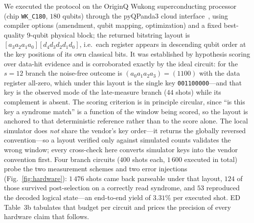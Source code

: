 \documentclass[aps,prxquantum,reprint,superscriptaddress]{revtex4-2}
\begin{document}
We executed the protocol on the OriginQ Wukong superconducting processor
(chip \texttt{WK\_C180}, $180$ qubits) through the pyQPanda3 cloud
interface~\cite{pyqpanda3,originq_cloud}, using compiler options
(amendment, qubit mapping, optimization) and a fixed best-quality $9$-qubit
physical block; the returned bitstring layout is
$[a_3a_2a_1a_0][d_4d_3d_2d_1d_0]$, i.e.\ each register appears in descending
qubit order at the key positions of its own classical bits. It was established
by hypothesis scoring over data-hit evidence and is corroborated exactly by the
ideal circuit: for the $s{=}12$ branch the noise-free outcome is
$(a_0a_1a_2a_3)=(1100)$ with the data register all-zero, which under this layout
is the single key \texttt{001100000}---and that key is the observed mode of the
late-measure branch ($44$ shots) while its complement is absent. The scoring
criterion is in principle circular, since ``is this key a syndrome match'' is a
function of the window being scored, so the layout is anchored to that
deterministic reference rather than to the score alone. The local simulator does
\emph{not} share the vendor's key order---it returns the globally reversed
convention---so a layout verified only against simulated counts validates the
wrong window; every cross-check here converts simulator keys into the vendor
convention first. Four branch circuits ($400$ shots each, $1\,600$ executed in
total)
probe the two measurement schemes and two error injections
(Fig.~\ref{fig:hardware}): $1\,476$ shots came back parseable under that
layout, $124$ of those survived post-selection on a correctly read syndrome,
and $53$ reproduced the decoded logical state---an end-to-end yield of $3.31\%$
per executed shot. ED Table~3b tabulates that budget per circuit and prices the
precision of every hardware claim that follows.
\end{document}
